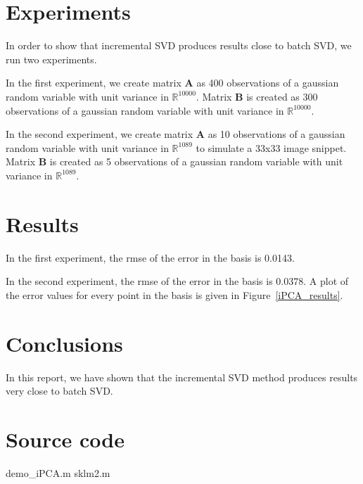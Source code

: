 \cite{2008_JNL_subspaceTRK_Ross}

\section{Experiments}
In order to show that incremental SVD produces results close to batch SVD, we run two experiments.

In the first experiment, we create matrix $\mathbf{A}$ as 400 observations of a gaussian random variable with unit variance in $\mathbb{R}^{10000}$.  Matrix $\mathbf{B}$ is created as 300 observations of a gaussian random variable with unit variance in $\mathbb{R}^{10000}$.  

In the second experiment, we create matrix $\mathbf{A}$ as 10 observations of a gaussian random variable with unit variance in $\mathbb{R}^{1089}$ to simulate a 33x33 image snippet.  Matrix $\mathbf{B}$ is created as 5 observations of a gaussian random variable with unit variance in $\mathbb{R}^{1089}$. 



\section{Results}
In the first experiment, the rmse of the error in the basis is 0.0143.

In the second experiment, the rmse of the error in the basis is 0.0378.  A plot of the error values for every point in the basis is given in Figure~\ref{iPCA_results}.




\section{Conclusions}
In this report, we have shown that the incremental SVD method produces results very close to batch SVD.


\appendix
\section{Source code}
\scriptsize
	{demo_iPCA.m}
		{sklm2.m}

\normalsize


